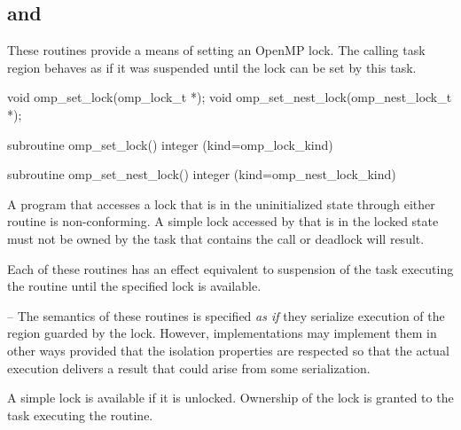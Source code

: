 \subsection{ and }
\label{subsec:omp_set_lock and omp_set_nest_lock}
\summary
These routines provide a means of setting an OpenMP lock. The calling
task region behaves as if it was suspended until the lock can be set
by this task.

\format
\ccppspecificstart
\begin{boxedcode}
void omp\_set\_lock(omp\_lock\_t *);
void omp\_set\_nest\_lock(omp\_nest\_lock\_t *);
\end{boxedcode}
\ccppspecificend

\fortranspecificstart
\begin{boxedcode}
subroutine omp\_set\_lock()
integer (kind=omp\_lock\_kind) 

subroutine omp\_set\_nest\_lock()
integer (kind=omp\_nest\_lock\_kind) 
\end{boxedcode}
\fortranspecificend

\constraints
A program that accesses a lock that is in the uninitialized state through either routine is 
non-conforming. A simple lock accessed by  that is in the locked state 
must not be owned by the task that contains the call or deadlock will result.

\effect
Each of these routines has an effect equivalent to suspension of the task
executing the routine until the specified lock is available. 


\notestart \noteheader – The semantics of these routines is specified
\emph{as if} they serialize execution of the region guarded by the
lock. However, implementations may implement them in other ways
provided that the isolation properties are respected so that the
actual execution delivers a result that could arise from some
serialization. 
\noteend

A simple lock is available if it is unlocked. Ownership of the lock is 
granted to the task executing the routine.

